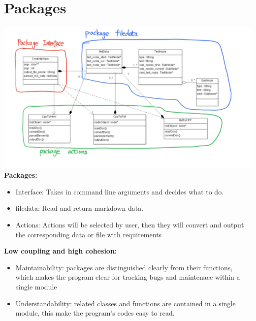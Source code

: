 \section{Packages}

\includegraphics[width=500pt]{images/Packages.png}
\textbf{Packages:}
\begin{itemize}
\item Interface: Takes in command line arguments and decides what to do.
\item filedata:  Read and return markdown data.
\item Actions:   Actions will be selected by user, then they will convert and output the corresponding data or file with requirements
\end{itemize}
\textbf{Low coupling and high cohesion:}
\begin{itemize}
\item Maintainability: packages are distinguished clearly from their functions, which makes the program clear for tracking bugs and maintenace within a single module
\item Understandability: related classes and functions are contained in a single module, this make the program's codes easy to read.
\end{itemize}
